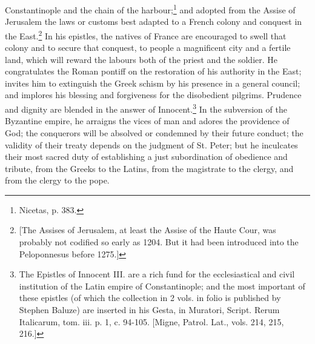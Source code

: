 Constantinople and the chain of the harbour;\footnote{Nicetas, p. 383.} and adopted from the Assise of Jerusalem the laws or customs best adapted to a French colony and conquest in the East.\footnote{[The Assises of Jerusalem, at least the Assise of the Haute Cour, was probably not codified so early as 1204. But it had been introduced into the Peloponnesus before 1275.]} In his epistles, the natives of France are encouraged to swell that colony and to secure that conquest, to people a magnificent city and a fertile land, which will reward the labours both of the priest and the soldier. He congratulates the Roman pontiff on the restoration of his authority in the East; invites him to extinguish the Greek schism by his presence in a general council; and implores his blessing and forgiveness for the disobedient pilgrims. Prudence and dignity are blended in the answer of Innocent.\footnote{The Epistles of Innocent III. are a rich fund for the ecclesiastical and civil institution of the Latin empire of Constantinople; and the most important of these epistles (of which the collection in 2 vols. in folio is published by Stephen Baluze) are inserted in his Gesta, in Muratori, Script. Rerum Italicarum, tom. iii. p. 1, c. 94-105. [Migne, Patrol. Lat., vols. 214, 215, 216.]} In the subversion of the Byzantine empire, he arraigns the vices of man and adores the providence of God; the conquerors will be absolved or condemned by their future conduct; the validity of their treaty depends on the judgment of St. Peter; but he inculcates their most sacred duty of establishing a just subordination of obedience and tribute, from the Greeks to the Latins, from the magistrate to the clergy, and from the clergy to the pope.

